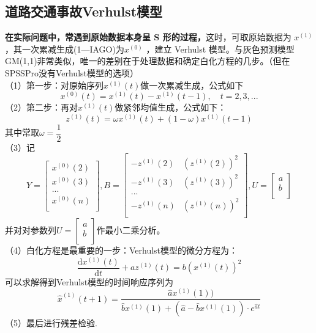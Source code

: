 \documentclass[11pt,a4paper]{article}
\begin{document}
\subsection{道路交通事故Verhulst模型}
\textbf{在实际问题中，常遇到原始数据本身呈 S 形的过程，}这时，可取原始数据为 $x^{(1)}$ ，其一次累减生成(1—IAGO)为$x^{(0)}$ ，建立 Verhulst 模型。与灰色预测模型GM(1,1)非常类似，唯一的差别在于处理数据和确定白化方程的几步。（但在SPSSPro没有Verhulst模型的选项）\\
（1）第一步：对原始序列$x^{(1)}(t)$做一次累减生成，公式如下
\begin{equation*}
	x^{(0)}(t)=x^{(1)}(t)-x^{(1)}(t-1), \quad t=2,3,...
\end{equation*}
（2）第二步：再对$x^{(1)}(t)$做紧邻均值生成，公式如下：
\begin{equation*}
	z^{(1)}(t)=\omega x^{(1)}(t)+(1-\omega )x^{(1)}(t-1)
\end{equation*}
其中常取$\omega=\dfrac{1}{2}$\\
（3）记
\begin{equation*}
	Y=\begin{bmatrix}
		x^{(0)}(2)\\
		x^{(0)}(3)\\
		...\\
		x^{(0)}(n)\\
	\end{bmatrix},
	B=\begin{bmatrix}
		-z^{(1)}(2) &(z^{(1)}(2))^2\\
		-z^{(1)}(3) & (z^{(1)}(3))^2\\
		...\\
		-z^{(1)}(n) & (z^{(1)}(n))^2\\
	\end{bmatrix},U=
	\begin{bmatrix}
		a\\
		b\\
	\end{bmatrix}
\end{equation*}并对对参数列$ U= \begin{bmatrix}
	 a \\
	 b \\
\end{bmatrix}$作最小二乘分析。\\
（4）白化方程是最重要的一步：Verhulst模型的微分方程为：
\begin{equation*}
	\dfrac{\mathrm{d}x^{(1)}(t)}{\mathrm{d}t}+az^{(1)}(t)=b(x^{(1)}(t))^2
\end{equation*}
可以求解得到Verhulst模型的时间响应序列为
\begin{equation*}
	\hat x^{(1)}(t+1)=\dfrac{\hat ax^{(1)}(1))}{\hat bx^{(1)}(1)+(\hat a -\hat b x^{(1)}(1))\cdot e^{\hat at}}
\end{equation*}
（5）最后进行残差检验.\\
\end{document}
